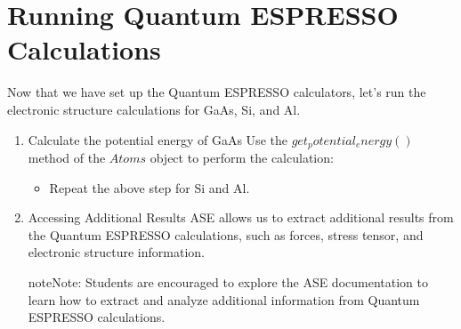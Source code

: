 \documentclass[letterpaper,10pt,english]{sphinxmanual}
\begin{document}
\section{Running Quantum ESPRESSO Calculations}
\label{\detokenize{qease/qease:running-quantum-espresso-calculations}}
\sphinxAtStartPar
Now that we have set up the Quantum ESPRESSO calculators, let’s run the electronic structure calculations for GaAs, Si, and Al.
\begin{enumerate}
%
\item {} 
\sphinxAtStartPar
Calculate the potential energy of GaAs
\sphinxhyphen{} Use the \(get_potential_energy()\) method of the \(Atoms\) object to perform the calculation:
\begin{quote}

\begin{sphinxVerbatim}[commandchars=\\\{\}]
  
  
\end{sphinxVerbatim}
\end{quote}
\begin{itemize}
\item {} 
\sphinxAtStartPar
Repeat the above step for Si and Al.

\end{itemize}

\item {} 
\sphinxAtStartPar
Accessing Additional Results
\sphinxhyphen{} ASE allows us to extract additional results from the Quantum ESPRESSO calculations, such as forces, stress tensor, and electronic structure information.

\begin{sphinxadmonition}{note}{Note:}
\sphinxAtStartPar
Students are encouraged to explore the ASE documentation to learn how to extract and analyze additional information from Quantum ESPRESSO calculations.
\end{sphinxadmonition}

\end{enumerate}
\end{document}

